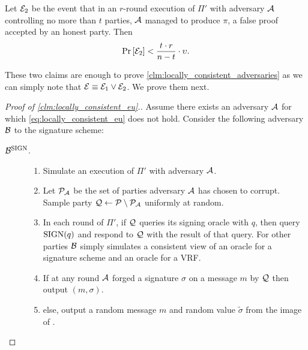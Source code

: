 \begin{claim}\label{clm:locally_consistent_vrf}
	Let $\mathcal{E}_2$ be the event that in an $r$-round execution of $\Pi'$ with adversary $\mathcal{A}$ controlling no more than $t$ parties, $\mathcal{A}$ managed to produce $\pi$, a false proof accepted by an honest party. Then
	\begin{align}\label{eq:locally_consistent_vrf}
	\Pr_{}\left[\mathcal{E}_2\right] < \frac{t\cdot r}{n-t}\cdot \upsilon.
	\end{align}
\end{claim}

These two claims are enough to prove \cref{clm:locally_consistent_adversaries} as we can simply note that $\mathcal{E} \equiv \mathcal{E}_1 \lor \mathcal{E}_2$. We prove them next.
\begin{proof}[Proof of \cref{clm:locally_consistent_eu}.]
	Assume there exists an adversary $\mathcal{A}$ for which \cref{eq:locally_consistent_eu} does not hold. Consider the following adversary $\mathcal{B}$ to the signature scheme:
	{\samepage
		\begin{description}
		\item[$\mathcal{B}^{\text{SIGN}}$.]		
		\begin{enumerate}
			\item Simulate an execution of $\Pi'$ with adversary $\mathcal{A}$.
			
			\item Let $\mathcal{P}_{\mathcal{A}}$ be the set of parties adversary $\mathcal{A}$ has chosen to corrupt. Sample party ${\mathcal{Q} \leftarrow \mathcal{P} \setminus \mathcal{P}_{\mathcal{A}}}$ uniformly at random.
			
			\item In each round of $\Pi'$, if $\mathcal{Q}$ queries its signing oracle with $q$, then query $\text{SIGN}(q)$ and respond to $\mathcal{Q}$ with the result of that query. For other parties $\mathcal{B}$ simply simulates a consistent view of an oracle for a signature scheme and an oracle for a VRF.
			
			\item If at any round $\mathcal{A}$ forged a signature $\sigma$ on a message $m$ by $\mathcal{Q}$ then output $(m,\sigma)$.
			
			\item else, output a random message $m$ and random value $\tilde{\sigma}$ from the image of \sig.
		\end{enumerate}
	\end{description}
}


\end{proof}
